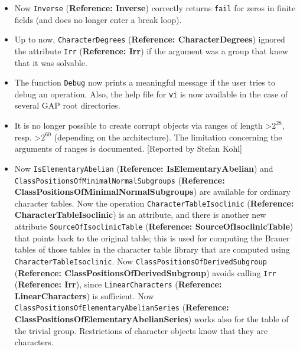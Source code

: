 \documentclass[a4paper,11pt]{report}
\begin{document}
{{\begin{itemize}
Luc Teirlinck] 
\item  Now \texttt{Inverse} (\textbf{Reference: Inverse}) correctly returns \texttt{fail} for zeros in finite fields (and does no longer enter a break loop). 
\item  Up to now, \texttt{CharacterDegrees} (\textbf{Reference: CharacterDegrees}) ignored the attribute \texttt{Irr} (\textbf{Reference: Irr}) if the argument was a group that knew that it was solvable. 
\item  The function \texttt{Debug} now prints a meaningful message if the user tries to debug an operation. Also,
the help file for \texttt{vi} is now available in the case of several \textsf{GAP} root directories. 
\item  It is no longer possible to create corrupt objects via ranges of length
{\textgreater}$2^{28}$, resp. {\textgreater}$2^{60}$ (depending on the architecture). The limitation concerning the arguments of
ranges is documented. [Reported by Stefan Kohl] 
\item  Now \texttt{IsElementaryAbelian} (\textbf{Reference: IsElementaryAbelian}) and \texttt{ClassPositionsOfMinimalNormalSubgroups} (\textbf{Reference: ClassPositionsOfMinimalNormalSubgroups}) are available for ordinary character tables. Now the operation \texttt{CharacterTableIsoclinic} (\textbf{Reference: CharacterTableIsoclinic}) is an attribute, and there is another new attribute \texttt{SourceOfIsoclinicTable} (\textbf{Reference: SourceOfIsoclinicTable}) that points back to the original table; this is used for computing the Brauer
tables of those tables in the character table library that are computed using \texttt{CharacterTableIsoclinic}. Now \texttt{ClassPositionsOfDerivedSubgroup} (\textbf{Reference: ClassPositionsOfDerivedSubgroup}) avoids calling \texttt{Irr} (\textbf{Reference: Irr}), since \texttt{LinearCharacters} (\textbf{Reference: LinearCharacters}) is sufficient. Now \texttt{ClassPositionsOfElementaryAbelianSeries} (\textbf{Reference: ClassPositionsOfElementaryAbelianSeries}) works also for the table of the trivial group. Restrictions of character
objects know that they are characters. 


\end{itemize}}}
\end{document}
